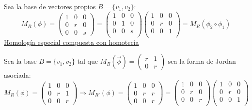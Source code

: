 \documentclass[10pt,a4paper,openright]{book}
\theoremstyle{break}
\begin{document}
\begin{itemize}
Sea la base de vectores propios $B = \{v_1, v_2\}$:
$$M_R (\phi) = \left(\begin{array}{c|cc}
1  & 0 & 0 \\
\hline
0 & r &  0 \\
0 & 0 &  s
\end{array}
\right) = \begin{pmatrix} 1 & 0 & 0 \\ 0 & 1 & 0 \\ 0 & 0 & s \\

\end{pmatrix} \begin{pmatrix} 1 & 0 & 0 \\ 0 & r & 0 \\ 0 & 0 & 1 \\

\end{pmatrix} = M_R (\phi_2 \circ \phi_1)
$$
\underline{Homología especial compuesta con homotecia}

Sea la base $B = \{v_1, v_2\}$ tal que $M_B(\vec{\phi}) = \begin{pmatrix}
r & 1 \\ 0 & r
\end{pmatrix}$ sea la forma de Jordan asociada:
$$M_R (\phi) = \left(\begin{array}{c|cc}
1  & 0 & 0 \\
\hline
0 & r &  1 \\
0 & 0 &  r
\end{array}
\right) \Rightarrow M_{R'} (\phi) = \left(\begin{array}{c|cc}
1  & 0 & 0 \\
\hline
0 & r &  r \\
0 & 0 &  r
\end{array}
\right) = \begin{pmatrix} 1 & 0 & 0 \\ 0 & r & 0 \\ 0 & 0 & r \\

\end{pmatrix} \begin{pmatrix} 1 & 0 & 0 \\ 0 & r & 0 \\ 0 & 0 & 1 \\

\end{pmatrix}$$
\end{itemize}
\end{document}
